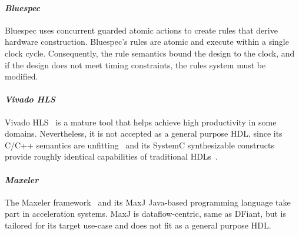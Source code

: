 \paragraph*{\bf \em Bluespec} 
Bluespec uses concurrent guarded atomic actions to create rules that derive hardware construction. Bluespec's rules are atomic and execute within a single clock cycle. Consequently, the rule semantics bound the design to the clock, and if the design does not meet timing constraints, the rules system must be modified. 

\paragraph*{\bf \em Vivado HLS} 
Vivado HLS~\cite{Vivado2012} is a mature tool that helps achieve high productivity in some domains. Nevertheless, it is not accepted as a general purpose HDL, since its C/C++ semantics are unfitting~\cite{Zhao2017} and its SystemC synthesizable constructs provide roughly identical capabilities of traditional HDLs~\cite{gajski2010input}.

\paragraph*{\bf \em Maxeler} 
The Maxeler framework~\cite{Pell2011} and its MaxJ Java-based programming language take part in acceleration systems. MaxJ is dataflow-centric, same as DFiant, but is tailored for its target use-case and does not fit as a general purpose HDL.
